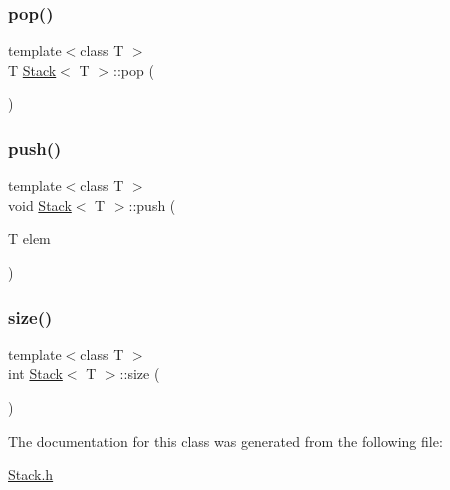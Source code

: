 \subsubsection{\texorpdfstring{pop()}{pop()}}
{\footnotesize\ttfamily template$<$class T $>$ \\
T \hyperlink{classStack}{Stack}$<$ T $>$\+::pop (\begin{DoxyParamCaption}{ }\end{DoxyParamCaption})\hspace{0.3cm}{\ttfamily [inline]}}

\mbox{\label{classStack_af2f55e27cd06d2661d6d797ecba58559}} 
\subsubsection{\texorpdfstring{push()}{push()}}
{\footnotesize\ttfamily template$<$class T $>$ \\
void \hyperlink{classStack}{Stack}$<$ T $>$\+::push (\begin{DoxyParamCaption}\item[{T}]{elem }\end{DoxyParamCaption})\hspace{0.3cm}{\ttfamily [inline]}}

\mbox{\label{classStack_a3091d98f798b1b3e69b644d5b778c428}} 
\subsubsection{\texorpdfstring{size()}{size()}}
{\footnotesize\ttfamily template$<$class T $>$ \\
int \hyperlink{classStack}{Stack}$<$ T $>$\+::size (\begin{DoxyParamCaption}{ }\end{DoxyParamCaption})\hspace{0.3cm}{\ttfamily [inline]}}



The documentation for this class was generated from the following file\+:\begin{DoxyCompactItemize}
\item 
\hyperlink{Stack_8h}{Stack.\+h}\end{DoxyCompactItemize}
